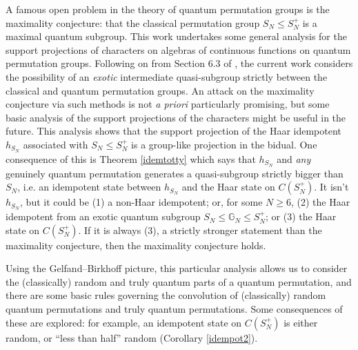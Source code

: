 \documentclass[12pt]{amsart}
\theoremstyle{remark}
\theoremstyle{remark}
\begin{document}
A famous open problem in the theory of quantum permutation groups is the maximality conjecture: that the classical permutation group $S_N\leq S_N^+$ is a maximal quantum subgroup. This work undertakes some general analysis for the support projections of characters on algebras of continuous functions on quantum permutation groups.   Following on from Section 6.3 of \cite{mcc}, the current work considers the possibility of an \emph{exotic} intermediate quasi-subgroup strictly between the classical and quantum permutation groups. An attack on the maximality conjecture via such methods is not \emph{a priori} particularly promising, but some basic analysis of the support projections of the characters might be useful in the future.  This analysis shows that the support projection of the Haar idempotent $h_{S_N}$ associated with $S_N\leq S_N^+$ is a group-like projection in the bidual. One consequence of this is Theorem \ref{idemtotty} which says that  $h_{S_N}$ and  \emph{any} genuinely quantum permutation generates a quasi-subgroup strictly bigger than $S_N$, i.e. an idempotent state between  $h_{S_N}$ and the Haar state on $C(S_N^+)$. It isn't  $h_{S_N}$, but it could be (1) a non-Haar idempotent; or, for some $N\geq 6$, (2) the Haar idempotent from an exotic quantum subgroup  $S_N\leq \mathbb{G}_N\leq S_N^+$; or (3) the Haar state on $C(S_N^+)$. If it is always (3), a strictly stronger statement than the maximality conjecture, then the maximality conjecture holds.

\bigskip

Using the Gelfand--Birkhoff picture, this particular analysis allows us to consider the (classically) random and truly quantum parts of a quantum permutation, and there are some basic rules governing the convolution of (classically) random quantum permutations and truly quantum permutations. Some consequences of these are explored: for example, an idempotent state on $C(S_N^+)$ is either random, or ``less than half'' random (Corollary \ref{idempot2}).


\bigskip
\end{document}
